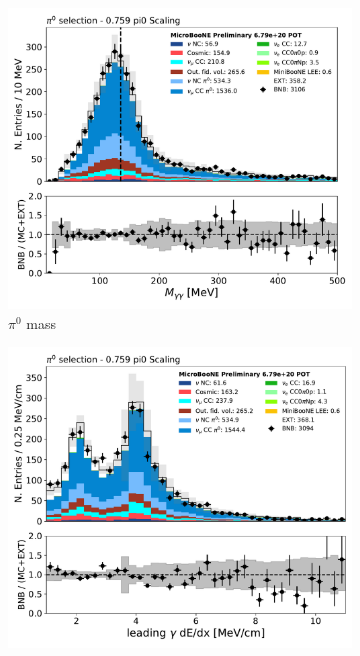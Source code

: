 \begin{figure}[H] 
\begin{center}
    \begin{subfigure}[b]{0.4\textwidth}
    \centering
    \includegraphics[width=1.00\textwidth]{detsys/datamc/pi0_mass_Y_corr_run123.pdf}
    \caption{\label{fig:detsys:datamc:pi0mass} $\pi^0$ mass}
    \end{subfigure}
    \begin{subfigure}[b]{0.4\textwidth}
    \centering
    \includegraphics[width=1.00\textwidth]{detsys/datamc/pi0_dedx1_fit_Y_run123.pdf}

\end{subfigure}
\end{center}
\end{figure}
